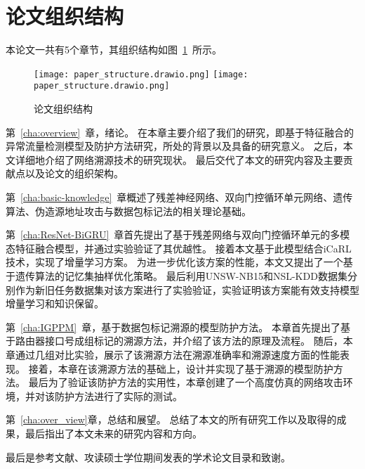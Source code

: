\section{论文组织结构}
本论文一共有5个章节，其组织结构如图~\ref{fig:paper_structure}~所示。
\begin{figure}[h]
  \centering
  \texttt{[image: paper\_structure.drawio.png]}
  \texttt{[image: paper\_structure.drawio.png]}
  \caption{论文组织结构}
  \label{fig:paper_structure}
\end{figure}

第~\ref{cha:overview}~章，绪论。
在本章主要介绍了我们的研究，即基于特征融合的异常流量检测模型及防护方法研究，所处的背景以及具备的研究意义。
之后，本文详细地介绍了网络溯源技术的研究现状。
最后交代了本文的研究内容及主要贡献点以及论文的组织架构。


第~\ref{cha:basic-knowledge}~章概述了残差神经网络、双向门控循环单元网络、遗传算法、伪造源地址攻击与数据包标记法的相关理论基础。

第~\ref{cha:ResNet-BiGRU}~章首先提出了基于残差网络与双向门控循环单元的多模态特征融合模型，并通过实验验证了其优越性。
接着本文基于此模型结合iCaRL技术，实现了增量学习方案。
为进一步优化该方案的性能，本文又提出了一个基于遗传算法的记忆集抽样优化策略。
最后利用UNSW-NB15和NSL-KDD数据集分别作为新旧任务数据集对该方案进行了实验验证，实验证明该方案能有效支持模型增量学习和知识保留。

第~\ref{cha:IGPPM}~章，基于数据包标记溯源的模型防护方法。
本章首先提出了基于路由器接口号成组标记的溯源方法，并介绍了该方法的原理及流程。
随后，本章通过几组对比实验，展示了该溯源方法在溯源准确率和溯源速度方面的性能表现。
接着，本章在该溯源方法的基础上，设计并实现了基于溯源的模型防护方法。
最后为了验证该防护方法的实用性，本章创建了一个高度仿真的网络攻击环境，并对该防护方法进行了实际的测试。

第~\ref{cha:over_view}章，总结和展望。
总结了本文的所有研究工作以及取得的成果，最后指出了本文未来的研究内容和方向。

最后是参考文献、攻读硕士学位期间发表的学术论文目录和致谢。
